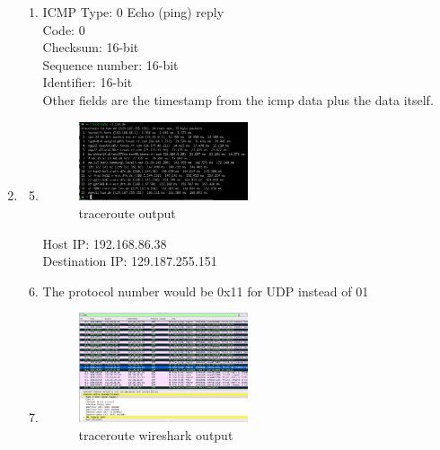 \documentclass[11pt]{article}
\begin{document}
\begin{enumerate}[label=(\alph*)]
{\begin{enumerate} [label=(\arabic*)]
{		Other fields are the timestamp from the icmp data plus the data itself.
	}
	
	\item {
		ICMP Type: 0 Echo (ping) reply \\
		Code: 0 \\
		Checksum: 16-bit \\
		Sequence number: 16-bit \\
		Identifier: 16-bit \\
		
		Other fields are the timestamp from the icmp data plus the data itself.
	}
	\end{enumerate}
}


\item {
	\begin{enumerate} [label=(\arabic*)]
	\setcounter{enumii}{4}
	
	\item {
		\begin{figure}[h] %
		\centering
		\includegraphics[width=0.5\textwidth]{traceroute-output}
		\caption{traceroute output}
		\end{figure}
		Host IP: 192.168.86.38 \\ 
		Destination IP: 129.187.255.151
	}
	
	\item {
		The protocol number would be 0x11 for UDP instead of 01
	}
	
	\item {
		\begin{figure}[h] %
		\centering
		\includegraphics[width=0.5\textwidth]{wireshark-output-2}
		\caption{traceroute wireshark output}
		\end{figure}
		
}
\end{enumerate}}
\end{enumerate}
\end{document}

